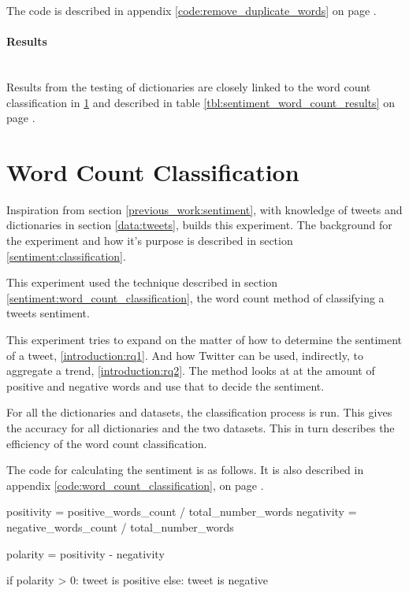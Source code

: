 The code is described in appendix \ref{code:remove_duplicate_words} on page
\pageref{code:remove_duplicate_words}.

\paragraph{Results}
\hspace{0pt}\\
Results from the testing of dictionaries are closely linked to the word count
classification in \ref{experiments:word_count_classification} and described in
table \ref{tbl:sentiment_word_count_results} on page
\pageref{tbl:sentiment_word_count_results}.
%

\section{Word Count Classification}\label{experiments:word_count_classification}
Inspiration from section \ref{previous_work:sentiment}, with knowledge of tweets
and dictionaries in section \ref{data:tweets}, builds this experiment. The
background for the experiment and how it's purpose is described in section
\ref{sentiment:classification}. 

This experiment used the technique described in section
\ref{sentiment:word_count_classification}, the word count method of classifying
a tweets sentiment.  

This experiment tries to expand on the matter of how to determine the sentiment
of a tweet, \ref{introduction:rq1}. And how Twitter can be used, indirectly, to
aggregate a trend, \ref{introduction:rq2}.
The method looks at at the amount of positive and negative words and use
that to decide the sentiment.

For all the dictionaries and datasets, the classification process is run. This
gives the accuracy for all dictionaries and the two datasets. This in turn
describes the efficiency of the word count classification.

The code for calculating the sentiment is as follows. It is also described in
appendix \ref{code:word_count_classification}, on page
\pageref{code:word_count_classification}.
\begin{python}
positivity = positive_words_count / total_number_words
negativity = negative_words_count / total_number_words

polarity = positivity - negativity

if polarity > 0:
    tweet is positive
else:
    tweet is negative
\end{python}

